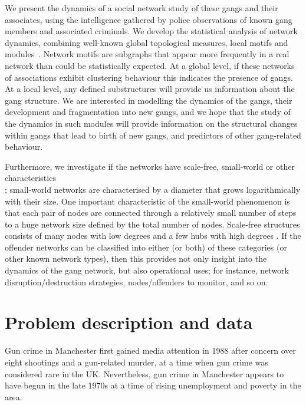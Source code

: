 \documentclass[twocolumn]{svjour3}          %
\theoremstyle{definition}
\begin{document}
We present the dynamics of a social network study of these gangs and
their associates, using the intelligence gathered by police
observations of known gang members and associated criminals. We
develop the statistical analysis of network dynamics, combining
well-known global topological measures, local motifs and
modules~\citep{CostaRodriguesTraviesoVillasBoas2007,Jackson2008,Newman2003}.
Network motifs are subgraphs that appear more frequently in a real
network than could be statistically expected. At a global level, if
these networks of associations exhibit clustering behaviour this
indicates the presence of gangs. At a local level, any defined
substructures will provide us information about the gang structure. We
are interested in modelling the dynamics of the gangs, their
development and fragmentation into new gangs, and we hope that the
study of the dynamics in such modules will provide information on the
structural changes within gangs that lead to birth of new gangs, and
predictors of other gang-related behaviour.

Furthermore, we investigate if the networks have scale-free,
small-world or other characteristics\\
\citep{Watts1999,AlbertBarabasi2002,Newman2003}; small-world networks
are characterised by a diameter that grows logarithmically with their
size. One important characteristic of the small-world phenomenon is
that each pair of nodes are connected through a relatively small
number of steps to a huge network size defined by the total number of
nodes. Scale-free structures consists of many nodes with low degrees
and a few hubs with high degrees
\citep{AlbAlbNak04,CostaRodriguesTraviesoVillasBoas2007,Jackson2008}. If
the offender networks can be classified into either (or both) of these
categories (or other known network types), then this provides not only
insight into the dynamics of the gang network, but also operational
uses; for instance, network disruption/destruction strategies,
nodes/offenders to monitor, and so on.


\section{Problem description and data}\label{sec:problemdescription}

Gun crime in Manchester first gained media attention in 1988 after
concern over eight shootings and a gun-related murder, at a time when
gun crime was considered rare in the UK. Nevertheless, gun crime in
Manchester appears to have begun in the late 1970s at a time of rising
unemployment and poverty in the area.
\end{document}
